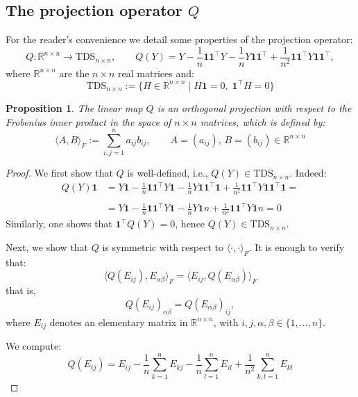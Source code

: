 \documentclass{article}
\newcommand{\R}{\mathbb{R}}
\theoremstyle{definition}
\theoremstyle{plain}
\newtheorem{proposition}{Proposition}
\newcommand{\TDS}{\mathrm{TDS}_{n \times n}}
\newcommand{\lra}{\longrightarrow}
\newcommand{\al}{\alpha}
\newcommand{\be}{\beta}
\begin{document}
\begin{appendices}
\section{The projection operator $Q$}\label{app-q}

For the reader's convenience we detail some properties of the projection operator:
\begin{equation}\label{lem:Q_frobenius}
Q: \R^{n\times n} \lra  \TDS, \qquad Q(Y)
= Y
- \frac{1}{n} \mathbf{1}\mathbf{1}^\top Y
- \frac{1}{n} Y \mathbf{1}\mathbf{1}^\top
+ \frac{1}{n^2} \mathbf{1}\mathbf{1}^\top Y \mathbf{1}\mathbf{1}^\top,
\end{equation}
where $\R^{n\times n}$ are the $n\times n$ real matrices and:
$$
 \TDS:= \{ H \in \mathbb{R}^{n\times n} \mid
H\mathbf{1} = 0,\;
\mathbf{1}^\top H = 0 \}
$$

\begin{proposition}
The linear map $Q$ is an orthogonal projection with respect to the Frobenius inner product in the space of $n \times n$ matrices, which is defined by:
$$
\langle A, B\rangle_F := \sum_{i,j=1}^n a_{ij}b_{ij},
\qquad A=(a_{ij}), \, B=(b_{ij}) \in \R^{n\times n}
$$
\end{proposition}

\begin{proof}
We first show that $Q$ is well-defined, i.e., $Q(Y) \in \TDS$. Indeed:
$$
\begin{array}{rl}
Q(Y)\mathbf{1} &= Y\mathbf{1}
- \frac{1}{n} \mathbf{1}\mathbf{1}^\top Y\mathbf{1}
- \frac{1}{n} Y \mathbf{1}\mathbf{1}^\top\mathbf{1}
+ \frac{1}{n^2} \mathbf{1}\mathbf{1}^\top Y \mathbf{1}\mathbf{1}^\top\mathbf{1}=\\ \\
&=Y\mathbf{1}
- \frac{1}{n} \mathbf{1}\mathbf{1}^\top Y\mathbf{1}
- \frac{1}{n} Y \mathbf{1}n
+ \frac{1}{n^2} \mathbf{1}\mathbf{1}^\top Y \mathbf{1}n=0
\end{array}
$$
Similarly, one shows that $\mathbf{1}^\top Q(Y) = 0$, hence $Q(Y) \in \TDS$.

Next, we show that $Q$ is symmetric with respect to $\langle \cdot, \cdot \rangle_F$.
It is enough to verify that:
\[
\langle Q(E_{ij}), E_{\alpha\beta} \rangle_F=\langle E_{ij}, Q(E_{\alpha\beta}) \rangle_F
\]
that is,
\[Q(E_{ij})_{\al\be}=Q(E_{\al\be})_{ij},\]
where $E_{ij}$ denotes an elementary matrix in $\R^{n \times n}$, with $i,j,\alpha,\beta \in \{1,\dots,n\}$.

We compute:
\[
Q(E_{ij}) = E_{ij}
- \frac{1}{n} \sum_{k=1}^n E_{kj}
- \frac{1}{n} \sum_{l=1}^n E_{il}
+ \frac{1}{n^2} \sum_{k,l=1}^n E_{kl}
\]


\end{proof}
\end{appendices}
\end{document}
